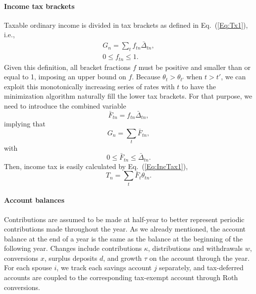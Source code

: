 \documentclass{report}[fleqn,11pt]
\begin{document}
\paragraph*{Income tax brackets}
	Taxable ordinary income is divided in tax brackets as defined in Eq.~(\ref{Eq:Tx1}), i.e.,
	\begin{eqnarray}
		\label{Eq:C2}
		G_n = \sum_t f_{tn}\bar{\Delta}_{tn} ,\nonumber\\
		0 \leq f_{tn} \leq 1.
	\end{eqnarray}
	Given this definition, all bracket fractions $f$ must be positive and smaller than or equal to 1,
	imposing an upper bound on $f$.
	Because $\theta_{t} > \theta_{t'}$ when $t > t'$, we can exploit
	this monotonically increasing series of rates with $t$ to have the minimization
	algorithm naturally fill the lower tax brackets.
	For that purpose, we need to introduce the combined variable
	\begin{equation}
		\bar{F}_{tn} = f_{tn}\bar{\Delta}_{tn},
	\end{equation}
	implying that
	\begin{equation}
		G_n = \sum_t \bar{F}_{tn},
	\end{equation}
	with
	\begin{equation}
		0 \le \bar{F}_{tn} \le \bar{\Delta}_{tn}.
	\end{equation}
	Then, income tax is easily calculated by Eq.~(\ref{Eq:IncTax1}), 
	\begin{equation*}
		T_n = \sum_t \bar{F}_t \theta_{tn}.
	\end{equation*}

\paragraph*{Account balances}
	Contributions are assumed to be made at half-year to better represent periodic contributions
	made throughout the year. As we already mentioned,
	the account balance at the end of a year is the same as the balance
	at the beginning of the following year.
	Changes include contributions $\kappa$, distributions and withdrawals $w$,
	conversions $x$, surplus deposits $d$, and growth $\tau$ on the account through the year.
	For each spouse $i$, we track each savings account $j$ separately, and tax-deferred accounts
	are coupled to the corresponding tax-exempt account through Roth conversions.
\end{document}
